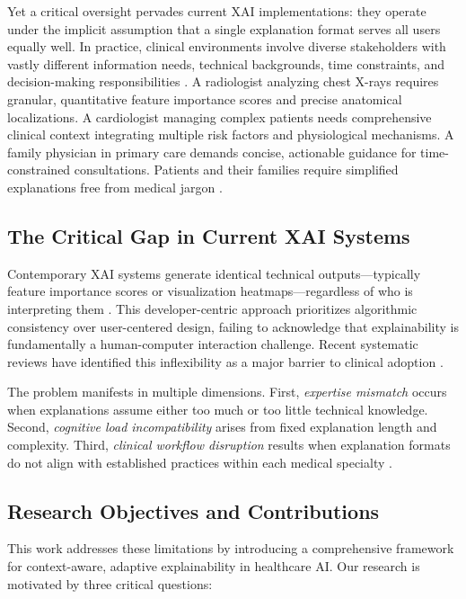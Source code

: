 \documentclass{ieeeaccess}
\begin{document}
Yet a critical oversight pervades current XAI implementations: they operate under the implicit assumption that a single explanation format serves all users equally well. In practice, clinical environments involve diverse stakeholders with vastly different information needs, technical backgrounds, time constraints, and decision-making responsibilities \cite{web3, web7}. A radiologist analyzing chest X-rays requires granular, quantitative feature importance scores and precise anatomical localizations. A cardiologist managing complex patients needs comprehensive clinical context integrating multiple risk factors and physiological mechanisms. A family physician in primary care demands concise, actionable guidance for time-constrained consultations. Patients and their families require simplified explanations free from medical jargon \cite{web18, web21}.

\subsection{The Critical Gap in Current XAI Systems}

Contemporary XAI systems generate identical technical outputs---typically feature importance scores or visualization heatmaps---regardless of who is interpreting them \cite{web10}. This developer-centric approach prioritizes algorithmic consistency over user-centered design, failing to acknowledge that explainability is fundamentally a human-computer interaction challenge. Recent systematic reviews have identified this inflexibility as a major barrier to clinical adoption \cite{web3, web5}.

The problem manifests in multiple dimensions. First, \textit{expertise mismatch} occurs when explanations assume either too much or too little technical knowledge. Second, \textit{cognitive load incompatibility} arises from fixed explanation length and complexity. Third, \textit{clinical workflow disruption} results when explanation formats do not align with established practices within each medical specialty \cite{web7, web9}.

\subsection{Research Objectives and Contributions}

This work addresses these limitations by introducing a comprehensive framework for context-aware, adaptive explainability in healthcare AI. Our research is motivated by three critical questions:
\end{document}
